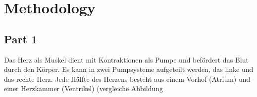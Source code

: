 \chapter{Methodology}
\label{sec:Methodology}
\section{Part 1}
\label{sec:06_Herz}
Das Herz als Muskel dient mit Kontraktionen als Pumpe und befördert das Blut durch den Körper. Es kann in zwei Pumpsysteme aufgeteilt werden, das linke und das rechte Herz. Jede Hälfte des Herzens besteht aus einem Vorhof (Atrium) und einer Herzkammer (Ventrikel) (vergleiche Abbildung 


